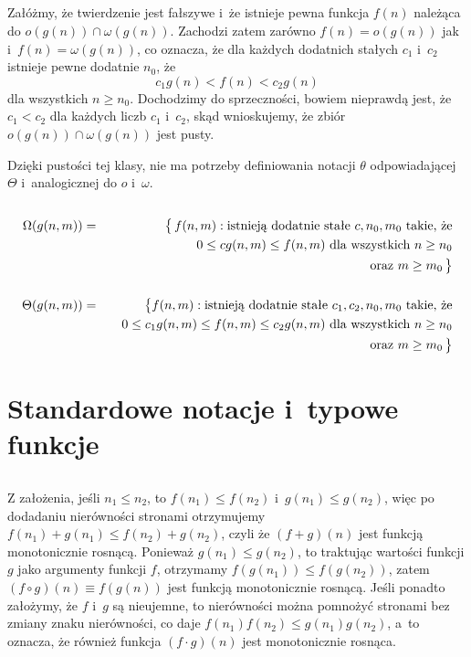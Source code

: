 \subsection{} %
Załóżmy, że twierdzenie jest fałszywe i~że istnieje pewna funkcja $f(n)$ należąca do $o(g(n))\cap\omega(g(n))$. Zachodzi zatem zarówno $f(n)=o(g(n))$ jak i~$f(n)=\omega(g(n))$, co oznacza, że dla każdych dodatnich stałych $c_1$ i~$c_2$ istnieje pewne dodatnie $n_0$, że
\[
	c_1g(n) < f(n) < c_2g(n)
\]
dla wszystkich $n\ge n_0$. Dochodzimy do sprzeczności, bowiem nieprawdą jest, że $c_1<c_2$ dla każdych liczb $c_1$ i~$c_2$, skąd wnioskujemy, że zbiór $o(g(n))\cap\omega(g(n))$ jest pusty.

Dzięki pustości tej klasy, nie ma potrzeby definiowania notacji $\theta$ odpowiadającej $\Theta$ i~analogicznej do $o$ i~$\omega$.

\subsection{} %
\begin{eqnarray*}
	\Omega(g(n,m)) &=& \bigl\{\,f(n,m):\hbox{istnieją dodatnie stałe }c,n_0,m_0\hbox{ takie, że} \\
	&& \quad 0 \le cg(n,m) \le f(n,m)\hbox{ dla wszystkich }n\ge n_0 \\
	&& \quad\hbox{oraz }m\ge m_0\,\bigr\} \\\\
	\Theta(g(n,m)) &=& \bigl\{f(n,m):\hbox{istnieją dodatnie stałe }c_1,c_2,n_0,m_0\hbox{ takie, że} \\
	&& \quad 0 \le c_1g(n,m) \le f(n,m) \le c_2g(n,m)\hbox{ dla wszystkich }n\ge n_0 \\
	&& \quad\hbox{oraz }m\ge m_0\,\bigr\}
\end{eqnarray*}

\section{Standardowe notacje i~typowe funkcje}

\subsection{} %
Z założenia, jeśli $n_1\le n_2$, to $f(n_1)\le f(n_2)$ i~$g(n_1)\le g(n_2)$, więc po dodadaniu nierówności stronami otrzymujemy $f(n_1)+g(n_1)\le f(n_2)+g(n_2)$, czyli że $(f+g)(n)$ jest funkcją monotonicznie rosnącą. Ponieważ $g(n_1)\le g(n_2)$, to traktując wartości funkcji $g$ jako argumenty funkcji $f$, otrzymamy $f(g(n_1))\le f(g(n_2))$, zatem $(f\circ g)(n)\equiv f(g(n))$ jest funkcją monotonicznie rosnącą. Jeśli ponadto założymy, że $f$ i~$g$ są nieujemne, to nierówności można pomnożyć stronami bez zmiany znaku nierówności, co daje $f(n_1)f(n_2)\le g(n_1)g(n_2)$, a~to oznacza, że również funkcja $(f\cdot g)(n)$ jest monotonicznie rosnąca.

